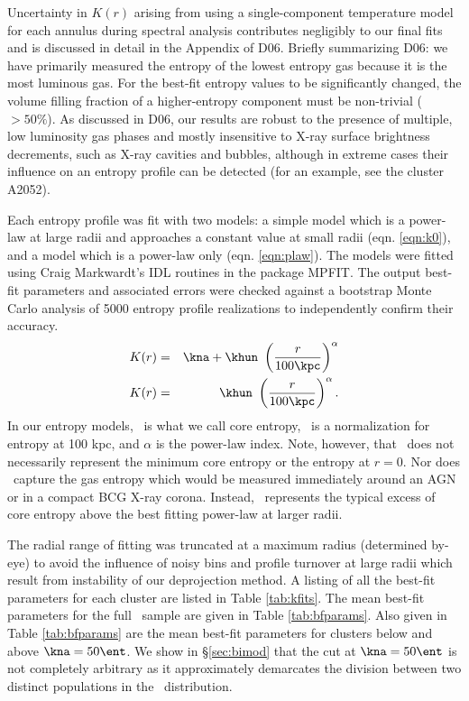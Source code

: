 \documentclass{emulateapj}
\begin{document}
Uncertainty in $K(r)$ arising from using a single-component
temperature model for each annulus during spectral analysis
contributes negligibly to our final fits and is discussed in detail in
the Appendix of D06. Briefly summarizing D06: we have primarily
measured the entropy of the lowest entropy gas because it is the most
luminous gas. For the best-fit entropy values to be significantly
changed, the volume filling fraction of a higher-entropy component
must be non-trivial ($> 50\%$). As discussed in D06, our results are
robust to the presence of multiple, low luminosity gas phases and
mostly insensitive to X-ray surface brightness decrements, such as
X-ray cavities and bubbles, although in extreme cases their influence
on an entropy profile can be detected (for an example, see the cluster
A2052).

Each entropy profile was fit with two models: a simple model which is
a power-law at large radii and approaches a constant value at small
radii (eqn. \ref{eqn:k0}), and a model which is a power-law only
(eqn. \ref{eqn:plaw}). The models were fitted using Craig Markwardt's
IDL routines in the package MPFIT. The output best-fit parameters and
associated errors were checked against a bootstrap Monte Carlo
analysis of 5000 entropy profile realizations to independently confirm
their accuracy.
\begin{eqnarray}
K(r) &=& \kna + \khun\ \left(\frac{r}{100 \kpc}\right)^{\alpha}\label{eqn:k0}\\
K(r) &=& \khun\ \left(\frac{r}{100 \kpc}\right)^{\alpha}\label{eqn:plaw}.
\end{eqnarray}
In our entropy models, \kna\ is what we call core entropy, \khun\ is a
normalization for entropy at 100 kpc, and $\alpha$ is the power-law
index. Note, however, that \kna\ does not necessarily represent the
minimum core entropy or the entropy at $r=0$. Nor does \kna\ capture
the gas entropy which would be measured immediately around an AGN or
in a compact BCG X-ray corona. Instead, \kna\ represents the typical
excess of core entropy above the best fitting power-law at larger
radii.

The radial range of fitting was truncated at a maximum radius
(determined by-eye) to avoid the influence of noisy bins and profile
turnover at large radii which result from instability of our
deprojection method. A listing of all the best-fit parameters for each
cluster are listed in Table \ref{tab:kfits}. The mean best-fit
parameters for the full \accept\ sample are given in Table
\ref{tab:bfparams}. Also given in Table \ref{tab:bfparams} are the
mean best-fit parameters for clusters below and above $\kna = 50
\ent$. We show in \S\ref{sec:bimod} that the cut at $\kna=50 \ent$ is
not completely arbitrary as it approximately demarcates the division
between two distinct populations in the \kna\ distribution.
\end{document}
